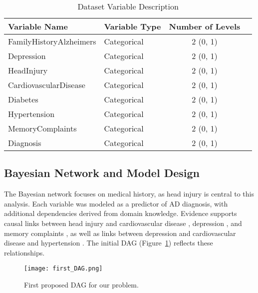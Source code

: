 \documentclass[12pt]{article}
\begin{document}
\begin{table}[H]
    \centering
    \caption{Dataset Variable Description}
    \begin{tabular}{|l|l|c|c|}
        \hline
        \textbf{Variable Name} & \textbf{Variable Type} & \textbf{Number of Levels} \\
        \hline
        FamilyHistoryAlzheimers & Categorical & 2 (0, 1)   \\
        Depression              & Categorical & 2 (0, 1)   \\
        HeadInjury              & Categorical & 2 (0, 1)   \\
        CardiovascularDisease              & Categorical & 2 (0, 1) \\
        Diabetes              & Categorical & 2 (0, 1) \\
        Hypertension              & Categorical & 2 (0, 1)  \\
        MemoryComplaints              & Categorical & 2 (0, 1) \\

        Diagnosis & Categorical & 2 (0, 1) \\
        \hline
    \end{tabular}
    \label{tab:variable_description}
\end{table}

\subsection{Bayesian Network and Model Design} The Bayesian network focuses on medical history, as head injury is central to this analysis. Each variable was modeled as a predictor of AD diagnosis, with additional dependencies derived from domain knowledge. Evidence supports causal links between head injury and cardiovascular disease \cite{stewart2022association}, depression \cite{jorge2004major}, and memory complaints \cite{izzy2023long}, as well as links between depression and cardiovascular disease \cite{khandaker2020shared} and hypertension \cite{inoue2024depressive}. The initial DAG (Figure~\ref{fig:first_DAG}) reflects these relationships.


\begin{figure}[H]
    \centering
    \texttt{[image: first\_DAG.png]} %
    \caption{First proposed DAG for our problem.}
    \label{fig:first_DAG} %
\end{figure}
\end{document}
